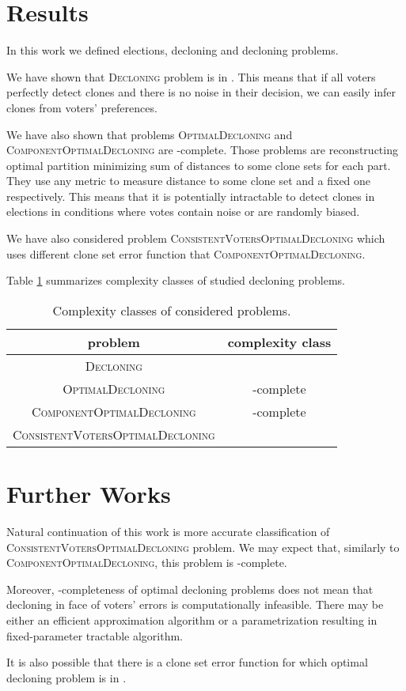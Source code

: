 \section{Results}

In this work we defined elections, decloning and decloning problems.

We have shown that \textsc{Decloning} problem is in \p.
This means that if all voters perfectly detect clones
and there is no noise in their decision,
we can easily infer clones from voters' preferences.

We have also shown that problems \textsc{OptimalDecloning} and \textsc{ComponentOptimalDecloning}
are \np-complete.
Those problems are reconstructing optimal partition minimizing 
sum of distances to some clone sets for each part.
They use any metric to measure distance to some clone set and a fixed one respectively.
This means that it is potentially intractable to detect clones in elections
in conditions where votes contain noise or are randomly biased.

We have also considered problem \textsc{ConsistentVotersOptimalDecloning}
which uses different clone set error function that \textsc{ComponentOptimalDecloning}.

Table \ref{cclasses} summarizes complexity classes of studied decloning problems.

\begin{table}
\centering
\begin{tabular}{| c | c |}\hline
	\textbf{problem} & \textbf{complexity class} \\ \hline
	\textsc{Decloning} & \p \\ \hline
	\textsc{OptimalDecloning} & \np-complete \\ \hline
	\textsc{ComponentOptimalDecloning} & \np-complete \\ \hline
	\textsc{ConsistentVotersOptimalDecloning} & \np \\ \hline
\end{tabular}
\caption{Complexity classes of considered problems.} \label{cclasses}
\end{table}


\section{Further Works}

Natural continuation of this work is more accurate classification of \textsc{ConsistentVotersOptimalDecloning} problem.
We may expect that, similarly to \textsc{ComponentOptimalDecloning}, this problem is \np-complete.

Moreover, \np-completeness of optimal decloning problems does not mean
that decloning in face of voters' errors is computationally infeasible.
There may be either an efficient approximation algorithm
or a parametrization resulting in fixed-parameter tractable algorithm.

It is also possible that there is a clone set error function for which optimal decloning problem is in \p.
